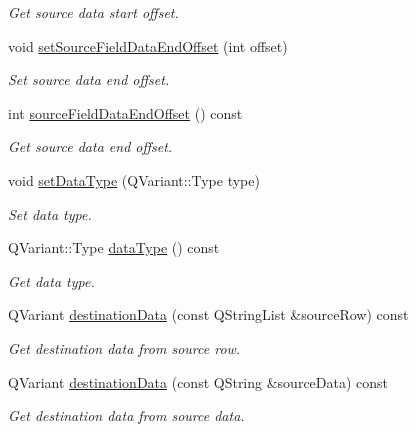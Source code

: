 \begin{DoxyCompactItemize}
\begin{DoxyCompactList}\small\item\em Get source data start offset. \end{DoxyCompactList}\item 
void \hyperlink{classmdt_field_map_item_a1f3ce5708a258078d8a8ced713bc99f8}{setSourceFieldDataEndOffset} (int offset)
\begin{DoxyCompactList}\small\item\em Set source data end offset. \end{DoxyCompactList}\item 
\hypertarget{classmdt_field_map_item_a71d1c69b8bc027f0af52275e5ad16248}{
int \hyperlink{classmdt_field_map_item_a71d1c69b8bc027f0af52275e5ad16248}{sourceFieldDataEndOffset} () const }
\label{classmdt_field_map_item_a71d1c69b8bc027f0af52275e5ad16248}

\begin{DoxyCompactList}\small\item\em Get source data end offset. \end{DoxyCompactList}\item 
\hypertarget{classmdt_field_map_item_a38126faa3f0bbdddadaa79c95b26d42c}{
void \hyperlink{classmdt_field_map_item_a38126faa3f0bbdddadaa79c95b26d42c}{setDataType} (QVariant::Type type)}
\label{classmdt_field_map_item_a38126faa3f0bbdddadaa79c95b26d42c}

\begin{DoxyCompactList}\small\item\em Set data type. \end{DoxyCompactList}\item 
\hypertarget{classmdt_field_map_item_a99e7d2031b825c6258340e28429c6d7d}{
QVariant::Type \hyperlink{classmdt_field_map_item_a99e7d2031b825c6258340e28429c6d7d}{dataType} () const }
\label{classmdt_field_map_item_a99e7d2031b825c6258340e28429c6d7d}

\begin{DoxyCompactList}\small\item\em Get data type. \end{DoxyCompactList}\item 
QVariant \hyperlink{classmdt_field_map_item_a7a9e05642484dabc844cbbf1bf1b01ee}{destinationData} (const QStringList \&sourceRow) const 
\begin{DoxyCompactList}\small\item\em Get destination data from source row. \end{DoxyCompactList}\item 
QVariant \hyperlink{classmdt_field_map_item_a8572c7132417ffce29a31d4c2efe7741}{destinationData} (const QString \&sourceData) const 
\begin{DoxyCompactList}\small\item\em Get destination data from source data. \end{DoxyCompactList}\end{DoxyCompactItemize}


